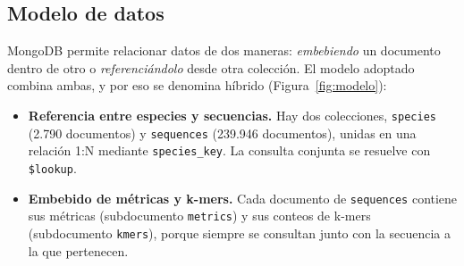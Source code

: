 \documentclass[pdflatex,lineno,referee,sn-vancouver-num]{sn-jnl}
\theoremstyle{thmstyleone}%
\theoremstyle{thmstyletwo}%
\theoremstyle{thmstylethree}%
\begin{document}
\subsection{Modelo de datos}\label{subsec:modelo}

MongoDB permite relacionar datos de dos maneras: \emph{embebiendo} un documento dentro de otro o \emph{referenciándolo} desde otra colección. El modelo adoptado combina ambas, y por eso se denomina híbrido (Figura~\ref{fig:modelo}):

\begin{itemize}
  \item \textbf{Referencia entre especies y secuencias.} Hay dos colecciones, \texttt{species} (2.790 documentos) y \texttt{sequences} (239.946 documentos), unidas en una relación 1:N mediante \texttt{species\_key}. La consulta conjunta se resuelve con \texttt{\$lookup}.
  \item \textbf{Embebido de métricas y k-mers.} Cada documento de \texttt{sequences} contiene sus métricas (subdocumento \texttt{metrics}) y sus conteos de k-mers (subdocumento \texttt{kmers}), porque siempre se consultan junto con la secuencia a la que pertenecen.
\end{itemize}
\end{document}
